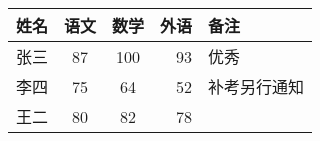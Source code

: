 \documentclass{ctexart}
\begin{document}
    \begin{tabular}{|l||c|c|r|p{1.5cm}|}
        \hline
        姓名 & 语文 & 数学 & 外语 & 备注 \\
        \hline \hline
        张三 & 87 & 100 & 93 & 优秀 \\
        \hline
        李四 & 75 & 64 & 52 & 补考另行通知 \\
        \hline
        王二 & 80 & 82 & 78 & \\
        \hline
    \end{tabular}
\end{document}
